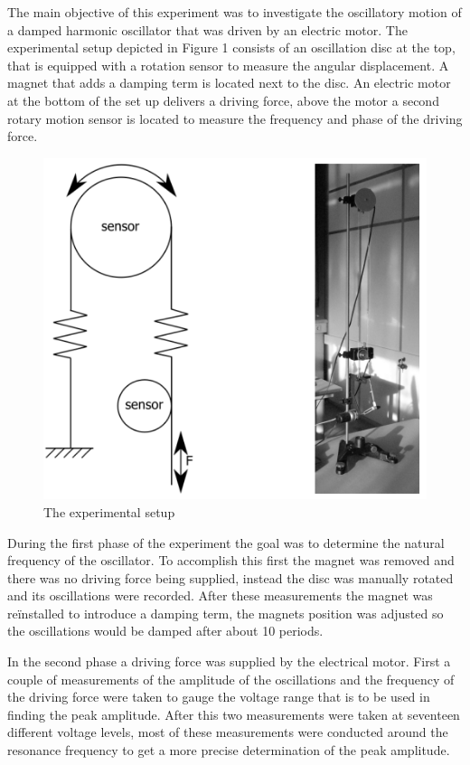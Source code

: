 The main objective of this experiment was to investigate the oscillatory motion of a damped harmonic oscillator that was driven by an electric motor. The experimental setup depicted in Figure 1 consists of an oscillation disc at the top, that is equipped with a rotation sensor to measure the angular displacement. A magnet that adds a damping term is located next to the disc. An electric motor at the bottom of the set up delivers a driving force, above the motor a second rotary motion sensor is located to measure the frequency and phase of the driving force.

\begin{figure}[h!]
    \centering
    \includegraphics[width=1\textwidth]{oscillations/images/setup}
    \caption{The experimental setup}
    \label{fig:setup}
\end{figure}

During the first phase of the experiment the goal was to determine the natural frequency of the oscillator. To accomplish this first the magnet was removed and there was no driving force being supplied, instead the disc was manually rotated and its oscillations were recorded.
After these measurements the magnet was reïnstalled to introduce a damping term, the magnets position was adjusted so the oscillations would be damped after about 10 periods.

In the second phase a driving force was supplied by the electrical motor. First a couple of measurements of the amplitude of the oscillations and the frequency of the driving force were taken to gauge the voltage range that is to be used in finding the peak amplitude. After this two measurements were taken at seventeen different voltage levels, most of these measurements were conducted around the resonance frequency to get a more precise determination of the peak amplitude.

